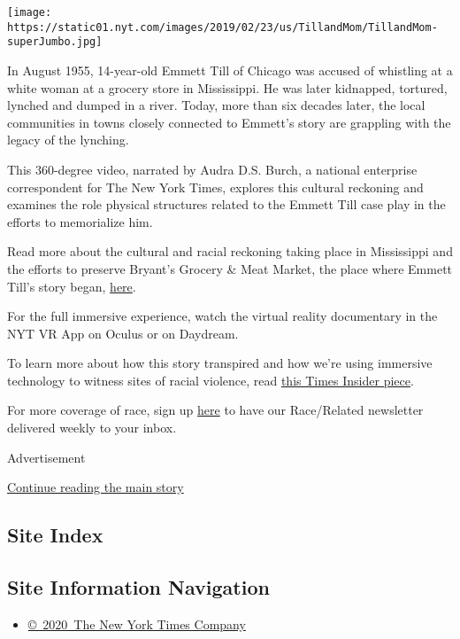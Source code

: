 \texttt{[image: https://static01.nyt.com/images/2019/02/23/us/TillandMom/TillandMom-superJumbo.jpg]}

In August 1955, 14-year-old Emmett Till of Chicago was accused of
whistling at a white woman at a grocery store in Mississippi. He was
later kidnapped, tortured, lynched and dumped in a river. Today, more
than six decades later, the local communities in towns closely connected
to Emmett's story are grappling with the legacy of the lynching.

This 360-degree video, narrated by Audra D.S. Burch, a national
enterprise correspondent for The New York Times, explores this cultural
reckoning and examines the role physical structures related to the
Emmett Till case play in the efforts to memorialize him.

Read more about the cultural and racial reckoning taking place in
Mississippi and the efforts to preserve Bryant's Grocery \& Meat Market,
the place where Emmett Till's story began,
\href{https://www.nytimes.com/interactive/2019/02/20/us/emmett-till-murder-legacy.html}{here}.

For the full immersive experience, watch the virtual reality documentary
in the NYT VR App on Oculus or on Daydream.

To learn more about how this story transpired and how we're using
immersive technology to witness sites of racial violence, read
\href{https://www.nytimes.com/2019/02/21/reader-center/emmett-till-reporting.html}{this
Times Insider piece}.

For more coverage of race, sign up
\href{https://www.nytimes.com/2018/10/01/us/subscribe-race-related-newsletter.html}{here}
to have our Race/Related newsletter delivered weekly to your inbox.

Advertisement

\protect\hyperlink{after-bottom}{Continue reading the main story}

\hypertarget{site-index}{%
\subsection{Site Index}\label{site-index}}

\hypertarget{site-information-navigation}{%
\subsection{Site Information
Navigation}\label{site-information-navigation}}

\begin{itemize}
\tightlist
\item
  \href{https://help.nytimes.com/hc/en-us/articles/115014792127-Copyright-notice}{©~2020~The
  New York Times Company}
\end{itemize}

